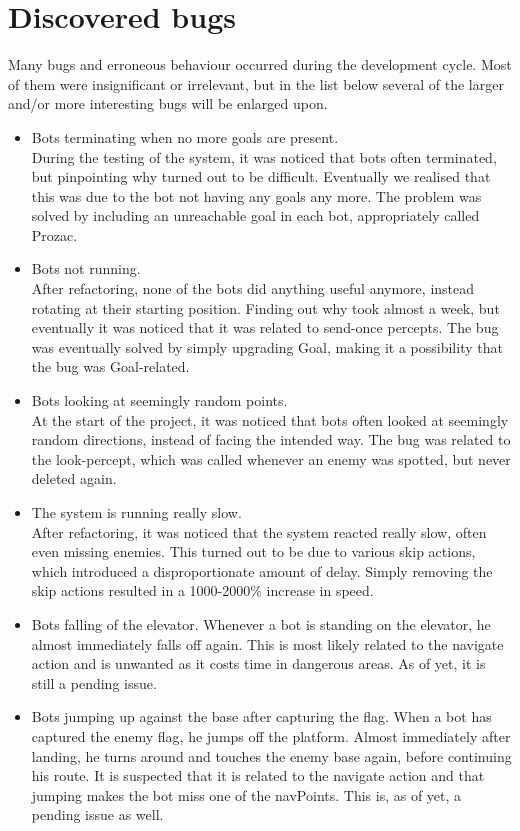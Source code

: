 \section{Discovered bugs}
Many bugs and erroneous behaviour occurred during the development cycle. Most of them were insignificant or irrelevant, but in the list below several of the larger and/or more interesting bugs will be enlarged upon.

\begin{itemize}
\item Bots terminating when no more goals are present. \\
	During the testing of the system, it was noticed that bots often terminated, but pinpointing why turned out to be difficult. Eventually we realised that this was due to the bot not having any goals any more. The problem was solved by including an unreachable goal in each bot, appropriately called Prozac.
	\\
\item Bots not running. \\
	After refactoring, none of the bots did anything useful anymore, instead rotating at their starting position. Finding out why took almost a week, but eventually it was noticed that it was related to send-once percepts. The bug was eventually solved by simply upgrading Goal, making it a possibility that the bug was Goal-related.
	\\
\item Bots looking at seemingly random points. \\
	At the start of the project, it was noticed that bots often looked at seemingly random directions, instead of facing the intended way. The bug was related to the look-percept, which was called whenever an enemy was spotted, but never deleted again. 
	\\
\item The system is running really slow. \\
	After refactoring, it was noticed that the system reacted really slow, often even missing enemies. This turned out to be due to various skip actions, which introduced a disproportionate amount of delay. Simply removing the skip actions resulted in a 1000-2000\% increase in speed.
	\\
\item Bots falling of the elevator.
	Whenever a bot is standing on the elevator, he almost immediately falls off again. This is most likely related to the navigate action and is unwanted as it costs time in dangerous areas. As of yet, it is still a pending issue. 
	\\
\item Bots jumping up against the base after capturing the flag.
	When a bot has captured the enemy flag, he jumps off the platform. Almost immediately after landing, he turns around and touches the enemy base again, before continuing his route. It is suspected that it is related to the navigate action and that jumping makes the bot miss one of the navPoints. This is, as of yet, a pending issue as well. 
	\\
\end{itemize}